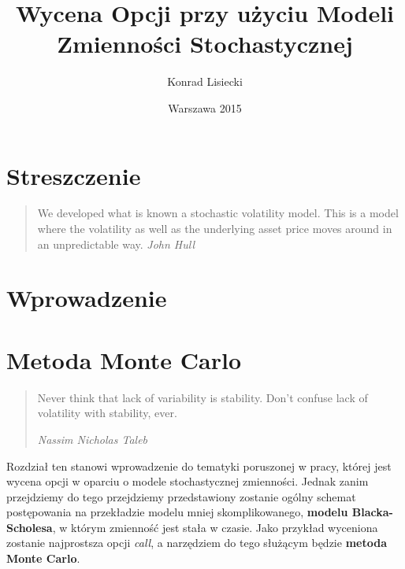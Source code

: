 \documentclass{pracamgr}
\author{Konrad Lisiecki}
\title{Wycena Opcji przy użyciu Modeli Zmienności Stochastycznej}
\date{Warszawa 2015}
\begin{document}
\maketitle
\nocite{book-full} 

\chapter*{Streszczenie} 

\begin{quote}
We developed what is known a stochastic volatility model. This is a model where the volatility as well as the underlying asset price moves around in an unpredictable way.
\raggedleft\slshape John Hull 
\end{quote}



\tableofcontents
 

 


\chapter{Wprowadzenie}
\label{chap:introduction}

\chapter{Metoda Monte Carlo}
\label{chap:introduction}

\begin{quote}

Never think that lack of variability is stability. Don't confuse lack of volatility with stability, ever.
 
\raggedleft\slshape Nassim Nicholas Taleb 
\end{quote}
 

Rozdział ten stanowi wprowadzenie do tematyki poruszonej w pracy, której jest wycena opcji w oparciu
o modele stochastycznej zmienności. 
Jednak zanim przejdziemy do tego przejdziemy przedstawiony zostanie ogólny schemat postępowania na
przekładzie modelu mniej skomplikowanego, \textbf{modelu Blacka-Scholesa}, w którym zmienność jest stała w czasie.
Jako przykład wyceniona zostanie najprostsza opcji \textit{call}, a narzędziem do tego służącym 
będzie \textbf{metoda Monte Carlo}.
\end{document}

